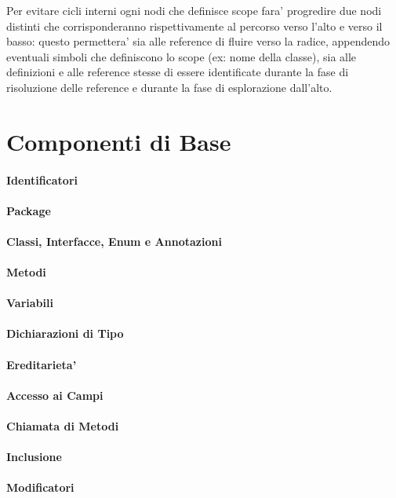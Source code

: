 Per evitare cicli interni ogni nodi che definisce scope fara' progredire due nodi distinti che corrisponderanno rispettivamente al percorso verso l'alto e verso il basso: questo permettera' sia alle reference di fluire verso la radice, appendendo eventuali simboli che definiscono lo scope (ex: nome della classe), sia alle definizioni e alle reference stesse di essere identificate durante la fase di risoluzione delle reference e durante la fase di esplorazione dall'alto.

\section{Componenti di Base}

\paragraph{Identificatori}

\paragraph{Package}

\paragraph{Classi, Interfacce, Enum e Annotazioni}

\paragraph{Metodi}

\paragraph{Variabili}

\paragraph{Dichiarazioni di Tipo}

\paragraph{Ereditarieta'}

\paragraph{Accesso ai Campi}

\paragraph{Chiamata di Metodi}

\paragraph{Inclusione}

\paragraph{Modificatori}
